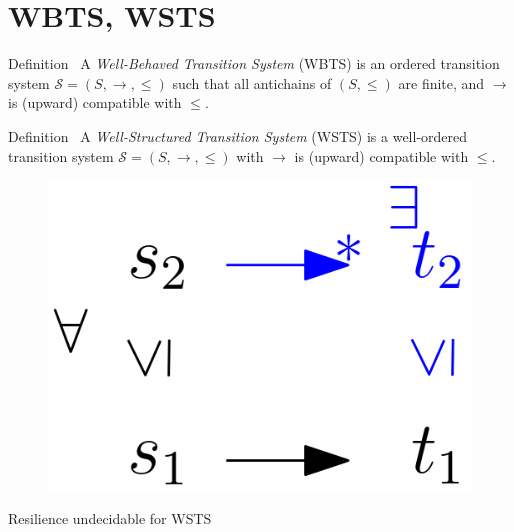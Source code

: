 \documentclass{beamer}
\begin{document}
	\section{WBTS, WSTS}
  \begin{frame}{}
  
  \begin{block}{Definition~\cite{DBLP:journals/lmcs/BlondinFM17}}
A {\em Well-Behaved Transition System} (WBTS) 
is an ordered transition system $\mathscr{S}=(S, \rightarrow, \leq)$ such that   
all antichains of $(S, \leq)$ are finite, and
$ \rightarrow$ is (upward) compatible with $\leq$. 
\end{block}



\begin{block}{Definition~\cite{DBLP:journals/iandc/Finkel90}}
A {\em Well-Structured Transition System} (WSTS) 
is a well-ordered transition system $\mathscr{S}=(S, \rightarrow, \leq)$ with 
 $ \rightarrow$ is (upward) compatible with $\leq$. 
\end{block}


   \begin{center}
 	\begin{figure}
\includegraphics[width=.25\textwidth]{WSTS_def}
	\end{figure}
\end{center}  

\pause

\begin{theorem}
{\sc Resilience} undecidable for WSTS
\end{theorem}







  \end{frame}
\end{document}
